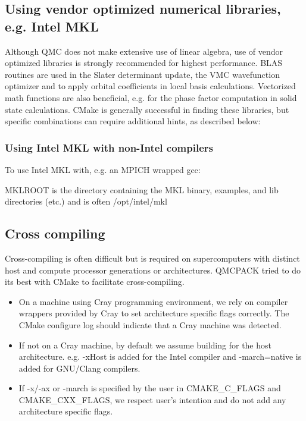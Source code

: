\subsection{Using vendor optimized numerical libraries, e.g. Intel MKL}

Although QMC does not make extensive use of linear algebra, use of
vendor optimized libraries is strongly recommended for highest
performance. BLAS routines are used in the Slater determinant update, the VMC wavefunction optimizer
and to apply orbital coefficients in local basis calculations. Vectorized
math functions are also beneficial, e.g. for the phase factor
computation in solid state calculations. CMake is generally successful
in finding these libraries, but specific combinations can require
additional hints, as described below:

\subsubsection{Using Intel MKL with non-Intel compilers}

To use Intel MKL with, e.g. an MPICH wrapped gcc:


MKLROOT is the directory containing the MKL binary, examples, and lib
directories (etc.) and is often /opt/intel/mkl

\subsection{Cross compiling}
Cross-compiling is often difficult but is required on supercomputers
with distinct host and compute processor generations or architectures.
QMCPACK tried to do its best with CMake to facilitate cross-compiling.

\begin{itemize}
  \item On a machine using Cray programming environment, we rely on
      compiler wrappers provided by Cray to set architecture specific
      flags correctly. The CMake configure log should indicate that a
      Cray machine was detected.
  \item If not on a Cray machine, by default we assume building for
    the host architecture. e.g. -xHost is added for the Intel compiler
    and -march=native is added for GNU/Clang compilers.
  \item If -x/-ax or -march is specified by the user in CMAKE\_C\_FLAGS and CMAKE\_CXX\_FLAGS,
    we respect user's intention and do not add any architecture specific flags.
\end{itemize}

